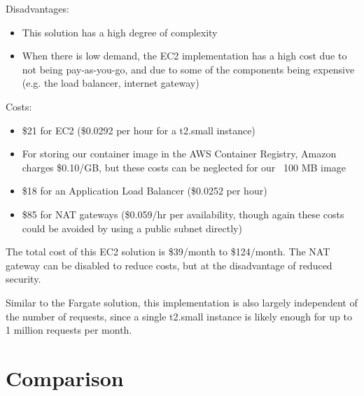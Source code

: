 Disadvantages:
\begin{itemize}
\item This solution has a high degree of complexity
\item When there is low demand, the EC2 implementation has a high cost due to not being pay-as-you-go, and due to some of the components being expensive (e.g. the load balancer, internet gateway)
\end{itemize}

Costs:
\begin{itemize}
\item \$21 for EC2 (\$0.0292 per hour for a t2.small instance)
\item For storing our container image in the AWS Container Registry, Amazon charges \$0.10/GB, but these costs can be neglected for our ~100 MB image
\item \$18 for an Application Load Balancer (\$0.0252 per hour)
\item \$85 for NAT gateways (\$0.059/hr per availability, though again these costs could be avoided by using a public subnet directly)
\end{itemize}

The total cost of this EC2 solution is \$39/month to \$124/month. The NAT gateway can be disabled to reduce costs, but at the disadvantage of reduced security.

Similar to the Fargate solution, this implementation is also largely independent of the number of requests, since a single t2.small instance is likely enough for up to 1 million requests per month.

\section{Comparison}

